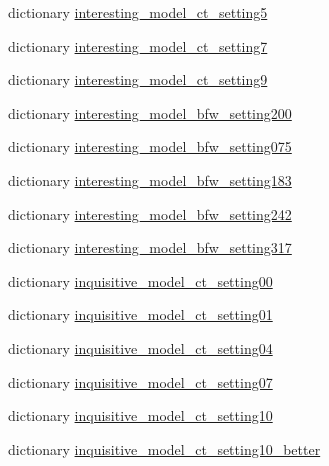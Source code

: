 \begin{DoxyCompactItemize}
\item 
dictionary \hyperlink{namespacemturk_1_1model__configs_a77e670f5bb02fd126c69a1b06ecda8b0}{interesting\+\_\+model\+\_\+ct\+\_\+setting5}
\item 
dictionary \hyperlink{namespacemturk_1_1model__configs_a157d4b50457ea66bdf6090e6be1d4f6b}{interesting\+\_\+model\+\_\+ct\+\_\+setting7}
\item 
dictionary \hyperlink{namespacemturk_1_1model__configs_a3abec9c2c49fae2c96791d8d1a4338f4}{interesting\+\_\+model\+\_\+ct\+\_\+setting9}
\item 
dictionary \hyperlink{namespacemturk_1_1model__configs_ad451f7692fd4249be401a7217b7d5edb}{interesting\+\_\+model\+\_\+bfw\+\_\+setting200}
\item 
dictionary \hyperlink{namespacemturk_1_1model__configs_ac062c479f4cd03114eded2530c59fba7}{interesting\+\_\+model\+\_\+bfw\+\_\+setting075}
\item 
dictionary \hyperlink{namespacemturk_1_1model__configs_aabea7333853a191c182b26392d65823f}{interesting\+\_\+model\+\_\+bfw\+\_\+setting183}
\item 
dictionary \hyperlink{namespacemturk_1_1model__configs_a55169a5d34f0f580a696ce6e4954bc44}{interesting\+\_\+model\+\_\+bfw\+\_\+setting242}
\item 
dictionary \hyperlink{namespacemturk_1_1model__configs_a41b85bd8d23c7a70e4e650700cd1ea0b}{interesting\+\_\+model\+\_\+bfw\+\_\+setting317}
\item 
dictionary \hyperlink{namespacemturk_1_1model__configs_add0d0abcb8882069ba9b63764515fcc1}{inquisitive\+\_\+model\+\_\+ct\+\_\+setting00}
\item 
dictionary \hyperlink{namespacemturk_1_1model__configs_a455699f26b796dbd0e03d64bf895c03f}{inquisitive\+\_\+model\+\_\+ct\+\_\+setting01}
\item 
dictionary \hyperlink{namespacemturk_1_1model__configs_aac628bb64ee97c325733042e98cce5c9}{inquisitive\+\_\+model\+\_\+ct\+\_\+setting04}
\item 
dictionary \hyperlink{namespacemturk_1_1model__configs_a9cd0063a3668f14aa326fc65e1124661}{inquisitive\+\_\+model\+\_\+ct\+\_\+setting07}
\item 
dictionary \hyperlink{namespacemturk_1_1model__configs_a5554ee972af5a98e7a4eac6d80e5896b}{inquisitive\+\_\+model\+\_\+ct\+\_\+setting10}
\item 
dictionary \hyperlink{namespacemturk_1_1model__configs_a6e8e2eb9d28d188d09798284a617ba35}{inquisitive\+\_\+model\+\_\+ct\+\_\+setting10\+\_\+better}
\item 

\end{DoxyCompactItemize}
